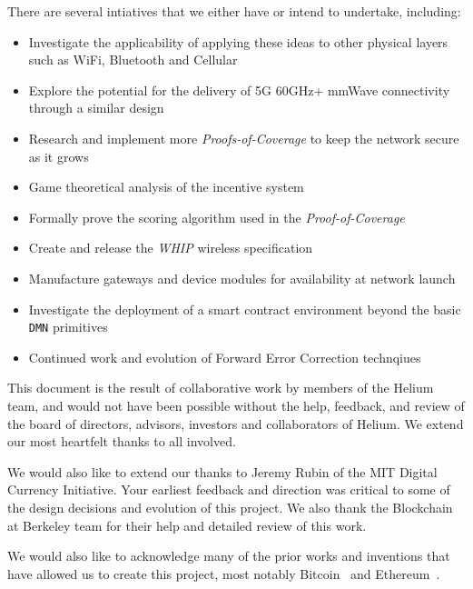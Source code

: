 \documentclass[UTF8, 10pt, nonatbib, nocopyrightspace, reprint]{sigplanconf}
\begin{document}
There are several intiatives that we either have or intend to undertake, including:

\begin{itemize}
    \item Investigate the applicability of applying these ideas to other physical layers such as WiFi, Bluetooth and Cellular
    \item Explore the potential for the delivery of 5G 60GHz+ mmWave connectivity through a similar design
    \item Research and implement more \emph{Proofs-of-Coverage} to keep the network secure as it grows
    \item Game theoretical analysis of the incentive system
    \item Formally prove the scoring algorithm used in the \emph{Proof-of-Coverage}
    \item Create and release the \emph{WHIP} wireless specification
    \item Manufacture gateways and device modules for availability at network launch
    \item Investigate the deployment of a smart contract environment beyond the basic \verb|DMN| primitives
    \item Continued work and evolution of Forward Error Correction technqiues
\end{itemize}

\acks

This document is the result of collaborative work by members of the Helium team, and would not have been possible without the help, feedback, and review of the board of directors, advisors, investors and collaborators of Helium. We extend our most heartfelt thanks to all involved.

We would also like to extend our thanks to Jeremy Rubin of the MIT Digital Currency Initiative. Your earliest feedback and direction was critical to some of the design decisions and evolution of this project. We also thank the Blockchain at Berkeley team for their help and detailed review of this work.

We would also like to acknowledge many of the prior works and inventions that have allowed us to create this project, most notably Bitcoin~\cite{bitcoin} and Ethereum~\cite{ethereum}.
\newpage
\end{document}

